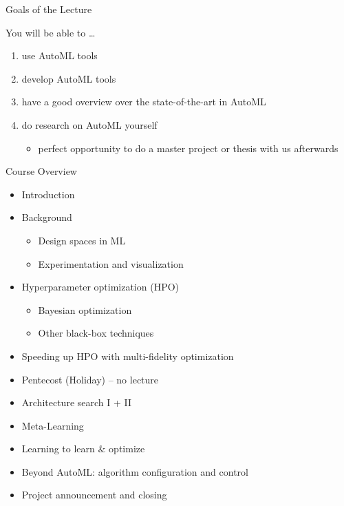 \begin{frame}[c]{Goals of the Lecture}

You will be able to \ldots
\begin{enumerate}
  \item use AutoML tools
  \smallskip
  \item develop AutoML tools
  \smallskip
  \item have a good overview over the state-of-the-art in AutoML
  \smallskip
  \item do research on AutoML yourself
  \begin{itemize}
    \item perfect opportunity to do a master project or thesis with us afterwards
  \end{itemize}
\end{enumerate}

\end{frame}
\begin{frame}[c]{Course Overview}

\begin{itemize}
	\item Introduction
	\item Background
	\begin{itemize}
		\item Design spaces in ML
		\item Experimentation and visualization
	\end{itemize}
	\item Hyperparameter optimization (HPO)
	\begin{itemize}
	  \item Bayesian optimization
	  \item Other black-box techniques
	\end{itemize}
	\item Speeding up HPO with multi-fidelity optimization
	\item Pentecost (Holiday) -- no lecture
	\item Architecture search I + II
	\item Meta-Learning
	\item Learning to learn $\&$ optimize
	\item Beyond AutoML: algorithm configuration and control
	\item Project announcement and closing
\end{itemize}


\end{frame}
